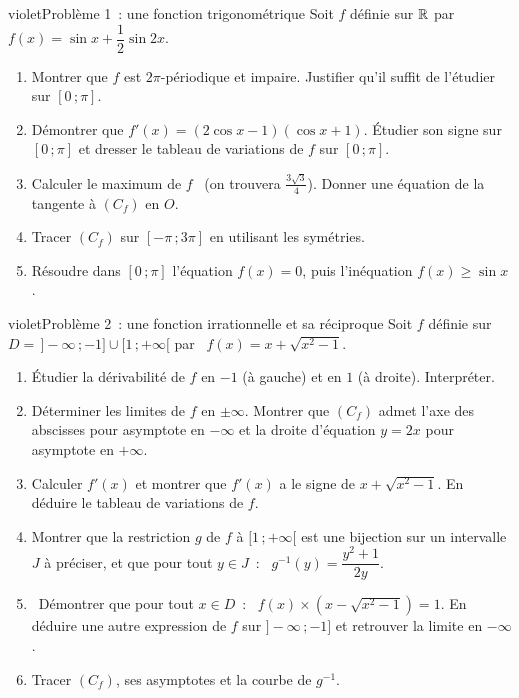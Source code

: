 
\begin{exo}{violet}{Problème 1~: une fonction trigonométrique }
Soit $f$ définie sur $\mathbb{R}$ par \ $f(x)=\sin x+\dfrac12\sin 2x$.
\begin{enumerate}
  \item Montrer que $f$ est $2\pi$-périodique et impaire. Justifier qu'il suffit de l'étudier sur $[0\,;\pi]$.
  \item Démontrer que $f'(x)=(2\cos x-1)(\cos x+1)$. Étudier son signe sur $[0\,;\pi]$ et dresser le tableau de variations de $f$ sur $[0\,;\pi]$.
  \item Calculer le maximum de $f$ \ (on trouvera $\frac{3\sqrt3}{4}$). Donner une équation de la tangente à $(C_f)$ en $O$.
  \item Tracer $(C_f)$ sur $[-\pi\,;3\pi]$ en utilisant les symétries.
  \item Résoudre dans $[0\,;\pi]$ l'équation $f(x)=0$, puis l'inéquation $f(x)\geq\sin x$.
\end{enumerate}
\end{exo}

\begin{exo}{violet}{Problème 2~: une fonction irrationnelle et sa réciproque }
Soit $f$ définie sur $D=\,]-\infty\,;-1]\cup[1\,;+\infty[$ par \ $f(x)=x+\sqrt{x^2-1}$.
\begin{enumerate}
  \item Étudier la dérivabilité de $f$ en $-1$ (à gauche) et en $1$ (à droite). Interpréter.
  \item Déterminer les limites de $f$ en $\pm\infty$. Montrer que $(C_f)$ admet l'axe des abscisses pour asymptote en $-\infty$ et la droite d'équation $y=2x$ pour asymptote en $+\infty$.
  \item Calculer $f'(x)$ et montrer que $f'(x)$ a le signe de $x+\sqrt{x^2-1}$. En déduire le tableau de variations de $f$.
  \item Montrer que la restriction $g$ de $f$ à $[1\,;+\infty[$ est une bijection sur un intervalle $J$ à préciser, et que pour tout $y\in J$~: \ $g^{-1}(y)=\dfrac{y^2+1}{2y}$.
  \item \demo\ Démontrer que pour tout $x\in D$~: \ $f(x)\times\left(x-\sqrt{x^2-1}\right)=1$. En déduire une autre expression de $f$ sur $]-\infty\,;-1]$ et retrouver la limite en $-\infty$.
  \item Tracer $(C_f)$, ses asymptotes et la courbe de $g^{-1}$.
\end{enumerate}
\end{exo}

